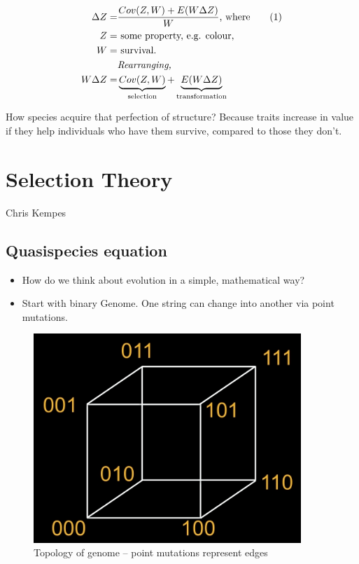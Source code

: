 \documentclass[]{article}
\newcommand\numberthis{\addtocounter{equation}{1}\tag{\theequation}}
\begin{document}
\begin{align*}
\Delta Z =& \frac{Cov(Z,W) + E(W \Delta Z)}{W}\text{, where} \numberthis \label{eq:price:equation}\\
Z=& \text{ some property, e.g. colour,}\\
W=& \text{ survival.}\\
 & \textit{Rearranging, }\\
W \Delta Z =& \underbrace{Cov(Z,W)}_\text{selection} + \underbrace{E(W \Delta Z)}_\text{transformation}
\end{align*}

How species acquire that perfection of structure? Because traits increase in value if they help individuals who have them survive, compared to those they don't.

\section{Selection Theory}
Chris Kempes

\subsection{Quasispecies equation}
\begin{itemize}
	\item How do we think about evolution in a simple, mathematical way?
	\item Start with binary Genome. One string can change into another via point mutations.
\end{itemize}


\begin{figure}[H]
	\caption{Topology of genome -- point mutations represent edges}\label{fig:GenomeTopology} 
	\includegraphics[width=0.9\textwidth]{GenomeTopology}
\end{figure}
\end{document}
